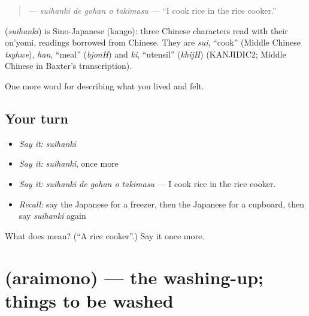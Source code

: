 \begin{quote}
\textbf{  } — \emph{suihanki de gohan o takimasu} — \textquotedblleft{}I cook rice in the rice cooker.\textquotedblright{}
\end{quote}

\begin{cousinweb}
\textbf{} (\emph{suihanki}) is Sino-Japanese (kango): three Chinese characters read with their on'yomi, readings borrowed from Chinese. They are \emph{sui}, \textquotedblleft{}cook\textquotedblright{} (Middle Chinese \emph{tsyhwe}), \emph{han}, \textquotedblleft{}meal\textquotedblright{} (\emph{bjonH}) and \emph{ki}, \textquotedblleft{}utensil\textquotedblright{} (\emph{khijH}) (KANJIDIC2; Middle Chinese in Baxter's transcription).
\end{cousinweb}

\begin{grammarlens}[title={What you've built}]
One more word for describing what you lived and felt.
\end{grammarlens}

\subsection*{Your turn}
\begin{itemize}
\raggedright
  \item \emph{Say it:} \emph{suihanki}
  \item \emph{Say it:} \emph{suihanki}, once more
  \item \emph{Say it:} \emph{suihanki de gohan o takimasu} — I cook rice in the rice cooker.
  \item \emph{Recall:} say the Japanese for a freezer, then the Japanese for a cupboard, then say \emph{suihanki} again
\end{itemize}

\begin{tcolorbox}[breakable,colback=teal!4,colframe=teal!35!black,title={Before you move on}]
What does  mean? (\textquotedblleft{}A rice cooker\textquotedblright{}.) Say it once more.
\end{tcolorbox}
\section[\texorpdfstring{\ja{あらいもの} (araimono)}{あらいもの (araimono)}]{ (araimono) — the washing-up; things to be washed}

